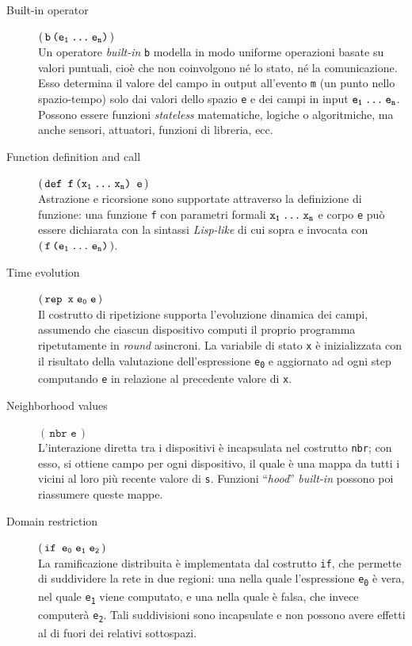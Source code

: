 \begin{description}
  \item[Built-in operator] \((\,\texttt{b\,(e\textsubscript{1}\:\dots{}\:e\textsubscript{n})}\,)\) \\
    Un operatore \emph{built-in} \texttt{b} modella in modo uniforme operazioni basate su valori puntuali, cioè che non coinvolgono né lo stato, né la comunicazione.
    Esso determina il valore del campo in output all'evento \texttt{m} (un punto nello spazio-tempo) solo dai valori dello spazio \texttt{e}
    e dei campi in input \(\texttt{e\textsubscript{1}\:\dots{}\:e\textsubscript{n}}\).
    Possono essere funzioni \emph{stateless} matematiche, logiche o algoritmiche, ma anche sensori, attuatori, funzioni di libreria, ecc.
  \item[Function definition and call] \((\,\texttt{def\ f\,(x\textsubscript{1}\:\dots{}\:x\textsubscript{n})\ e}\,)\) \\
    Astrazione e ricorsione sono supportate attraverso la definizione di funzione:
    una funzione \texttt{f} con parametri formali \(\texttt{x\textsubscript{1}\:\dots{}\:x\textsubscript{n}}\) e corpo \texttt{e}
    può essere dichiarata con la sintassi \emph{Lisp-like} di cui sopra e invocata con \((\,\texttt{f\,(e\textsubscript{1}\:\dots{}\:e\textsubscript{n})}\,)\).
  \item[Time evolution] \((\,\texttt{rep\ x\;e\textsubscript{0}\;e}\,)\) \\
    Il costrutto di ripetizione supporta l'evoluzione dinamica dei campi, assumendo che ciascun dispositivo computi il proprio programma ripetutamente in \emph{round} asincroni.
    La variabile di stato \texttt{x} è inizializzata con il risultato della valutazione dell'espressione \texttt{e\textsubscript{0}} e aggiornato ad ogni step computando \texttt{e} in relazione al precedente valore di \texttt{x}.
  \item[Neighborhood values] \((\,\texttt{nbr\ e}\,)\) \\
    L'interazione diretta tra i dispositivi è incapsulata nel costrutto \texttt{nbr};
    con esso, si ottiene campo per ogni dispositivo, il quale è una mappa da tutti i vicini al loro più recente valore di \texttt{s}.
    Funzioni ``\emph{hood}'' \emph{built-in} possono poi riassumere queste mappe.
  \item[Domain restriction] \((\,\texttt{if\ e\textsubscript{0}\;e\textsubscript{1}\;e\textsubscript{2}}\,)\) \\
    La ramificazione distribuita è implementata dal costrutto \texttt{if}, che permette di suddividere la rete in due regioni:
    una nella quale l'espressione \texttt{e\textsubscript{0}} è vera, nel quale \texttt{e\textsubscript{1}} viene computato, e una nella quale è falsa, che invece computerà \texttt{e\textsubscript{2}}.
    Tali suddivisioni sono incapsulate e non possono avere effetti al di fuori dei relativi sottospazi.
\end{description}

